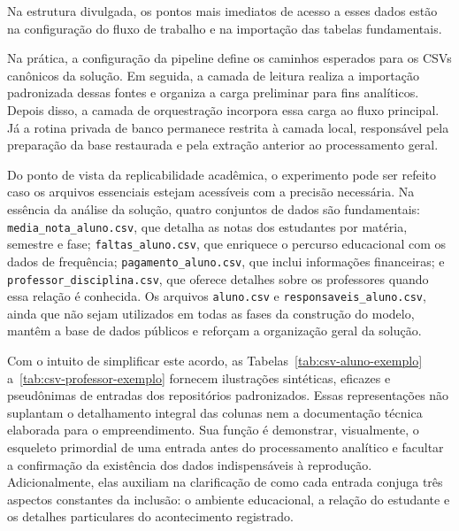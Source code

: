 Na estrutura divulgada, os pontos mais imediatos de acesso a esses dados est\~ao na configura\c{c}\~ao do fluxo de trabalho e na importa\c{c}\~ao das tabelas fundamentais.

Na pr\'atica, a configura\c{c}\~ao da pipeline define os caminhos esperados para os CSVs can\^onicos da solu\c{c}\~ao. Em seguida, a camada de leitura realiza a importa\c{c}\~ao padronizada dessas fontes e organiza a carga preliminar para fins anal\'iticos. Depois disso, a camada de orquestra\c{c}\~ao incorpora essa carga ao fluxo principal. J\'a a rotina privada de banco permanece restrita \`a camada local, respons\'avel pela prepara\c{c}\~ao da base restaurada e pela extra\c{c}\~ao anterior ao processamento geral.

Do ponto de vista da replicabilidade acad\^emica, o experimento pode ser refeito caso os arquivos essenciais estejam acess\'iveis com a precis\~ao necess\'aria. Na ess\^encia da an\'alise da solu\c{c}\~ao, quatro conjuntos de dados s\~ao fundamentais: \texttt{media\_nota\_aluno.csv}, que detalha as notas dos estudantes por mat\'eria, semestre e fase; \texttt{faltas\_aluno.csv}, que enriquece o percurso educacional com os dados de frequ\^encia; \texttt{pagamento\_aluno.csv}, que inclui informa\c{c}\~oes financeiras; e \texttt{professor\_disciplina.csv}, que oferece detalhes sobre os professores quando essa rela\c{c}\~ao \'e conhecida. Os arquivos \texttt{aluno.csv} e \texttt{responsaveis\_aluno.csv}, ainda que n\~ao sejam utilizados em todas as fases da constru\c{c}\~ao do modelo, mant\^em a base de dados p\'ublicos e refor\c{c}am a organiza\c{c}\~ao geral da solu\c{c}\~ao.

Com o intuito de simplificar este acordo, as Tabelas~\ref{tab:csv-aluno-exemplo} a~\ref{tab:csv-professor-exemplo} fornecem ilustra\c{c}\~oes sint\'eticas, eficazes e pseud\^onimas de entradas dos reposit\'orios padronizados. Essas representa\c{c}\~oes n\~ao suplantam o detalhamento integral das colunas nem a documenta\c{c}\~ao t\'ecnica elaborada para o empreendimento. Sua fun\c{c}\~ao \'e demonstrar, visualmente, o esqueleto primordial de uma entrada antes do processamento anal\'itico e facultar a confirma\c{c}\~ao da exist\^encia dos dados indispens\'aveis \`a reprodu\c{c}\~ao. Adicionalmente, elas auxiliam na clarifica\c{c}\~ao de como cada entrada conjuga tr\^es aspectos constantes da inclus\~ao: o ambiente educacional, a rela\c{c}\~ao do estudante e os detalhes particulares do acontecimento registrado.

